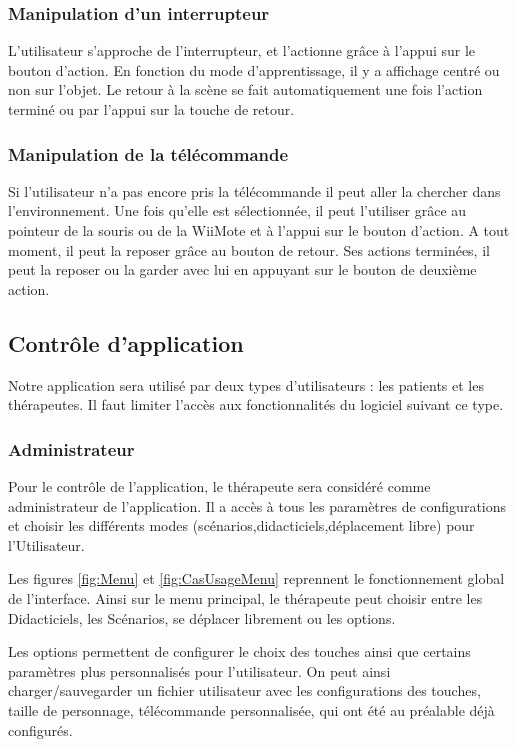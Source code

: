 \subsubsection{Manipulation d'un interrupteur}
L'utilisateur s'approche de l'interrupteur, et l'actionne grâce à l'appui sur le bouton d'action. En fonction du mode d'apprentissage, il y a affichage centré ou non sur l'objet. Le retour à la scène se fait automatiquement une fois l'action terminé ou par l'appui sur la touche de retour.

\subsubsection{Manipulation de la télécommande}
Si l'utilisateur n'a pas encore pris la télécommande il peut aller la chercher dans l'environnement. Une fois qu'elle est sélectionnée, il peut l'utiliser grâce au pointeur de la souris ou de la WiiMote et à l'appui sur le bouton d'action. A tout moment, il peut la reposer grâce au bouton de retour. Ses actions terminées, il peut la reposer ou la garder avec lui en appuyant sur le bouton de deuxième action.

\subsection{Contrôle d'application}
Notre application sera utilisé par deux types d'utilisateurs : les patients et les thérapeutes. Il faut limiter l'accès aux fonctionnalités du logiciel suivant ce type.

\subsubsection{Administrateur}
Pour le contrôle de l'application, le thérapeute sera considéré comme administrateur de l'application. Il a accès à
tous les paramètres de configurations et choisir les différents modes (scénarios,didacticiels,déplacement libre) pour l'Utilisateur.

Les figures \ref{fig:Menu} et \ref{fig:CasUsageMenu} reprennent le fonctionnement global de l'interface. Ainsi sur le menu principal, le thérapeute peut choisir entre les Didacticiels, les Scénarios, se déplacer librement ou les options.

Les options permettent de configurer le choix des touches ainsi que certains paramètres plus personnalisés pour l'utilisateur. On peut ainsi charger/sauvegarder un fichier utilisateur avec les configurations des touches, taille de personnage, télécommande personnalisée, qui ont été au préalable déjà configurés.

